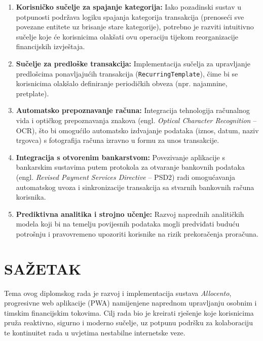 \documentclass[a4paper,12pt,oneside]{article}
\begin{document}
	\begin{enumerate}
		\item \textbf{Korisničko sučelje za spajanje kategorija:} Iako pozadinski sustav u potpunosti podržava logiku spajanja kategorija transakcija (prenoseći sve povezane entitete uz brisanje stare kategorije), potrebno je razviti intuitivno sučelje koje će korisnicima olakšati ovu operaciju tijekom reorganizacije financijskih izvještaja.
		
		\item \textbf{Sučelje za predloške transakcija:} Implementacija sučelja za upravljanje predlošcima ponavljajućih transakcija (\texttt{RecurringTemplate}), čime bi se korisnicima olakšalo definiranje periodičkih obveza (npr. najamnine, pretplate).
		
		\item \textbf{Automatsko prepoznavanje računa:} Integracija tehnologija računalnog vida i optičkog prepoznavanja znakova (engl. \textit{Optical Character Recognition} – OCR), što bi omogućilo automatsko izdvajanje podataka (iznos, datum, naziv trgovca) s fotografija računa izravno u formu za unos transakcije.
		
		\item \textbf{Integracija s otvorenim bankarstvom:} Povezivanje aplikacije s bankarskim sustavima putem protokola za otvaranje bankovnih podataka (engl. \textit{Revised Payment Services Directive} – PSD2) radi omogućavanja automatskog uvoza i sinkronizacije transakcija sa stvarnih bankovnih računa korisnika.
		
		\item \textbf{Prediktivna analitika i strojno učenje:} Razvoj naprednih analitičkih modela koji bi na temelju povijesnih podataka mogli predviđati buduću potrošnju i pravovremeno upozoriti korisnike na rizik prekoračenja proračuna.
	\end{enumerate}
	
	\newpage
	
	
	
	
	\newpage
	\section*{SAŽETAK}
	Tema ovog diplomskog rada je razvoj i implementacija sustava \textit{Allocento}, progresivne web aplikacije (PWA) namijenjene naprednom upravljanju osobnim i timskim financijskim tokovima. Cilj rada bio je kreirati rješenje koje korisnicima pruža reaktivno, sigurno i moderno sučelje, uz potpunu podršku za kolaboraciju te kontinuitet rada u uvjetima nestabilne internetske veze.
	
\end{document}
